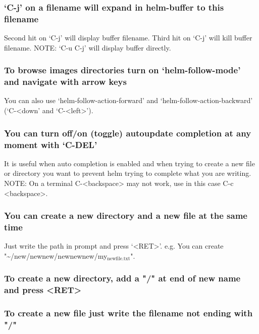 \documentclass[11pt]{article}
\begin{document}
\subsubsection{‘C-j’ on a filename will expand in helm-buffer to this filename}
\label{sec:orgeda465b}

Second hit on ‘C-j’ will display buffer filename.
Third hit on ‘C-j’ will kill buffer filename.
NOTE: ‘C-u C-j’ will display buffer directly.

\subsubsection{To browse images directories turn on ‘helm-follow-mode’ and navigate with arrow keys}
\label{sec:orgd4fc9aa}

You can also use ‘helm-follow-action-forward’ and ‘helm-follow-action-backward’
(‘C-<down’ and ‘C-<left>’).

\subsubsection{You can turn off/on (toggle) autoupdate completion at any moment with ‘C-DEL’}
\label{sec:org697512e}

It is useful when auto completion is enabled and when trying to create a new file
or directory you want to prevent helm trying to complete what you are writing.
NOTE: On a terminal C-<backspace> may not work, use in this case C-c <backspace>.

\subsubsection{You can create a new directory and a new file at the same time}
\label{sec:org9723cae}

Just write the path in prompt and press ‘<RET>’.
e.g. You can create "\textasciitilde{}/new/newnew/newnewnew/my\(_{\text{newfile.txt}}\)".

\subsubsection{To create a new directory, add a "/" at end of new name and press <RET>}
\label{sec:org605accc}

\subsubsection{To create a new file just write the filename not ending with "/"}
\label{sec:org2df9c22}
\end{document}
